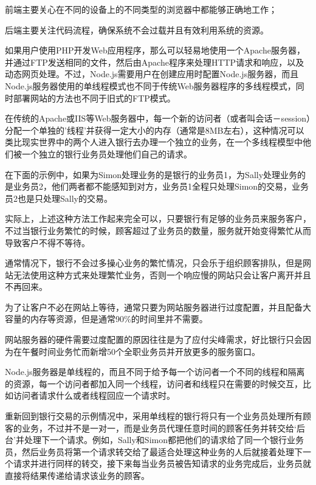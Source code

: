 \begin{compactitem}
\item 前端主要关心在不同的设备上的不同类型的浏览器中都能够正确地工作；
\item 后端主要关注代码流程，确保系统不会过载并且有效利用系统的资源。
\end{compactitem}


如果用户使用PHP开发Web应用程序，那么可以轻易地使用一个Apache服务器，并通过FTP发送相同的文件，然后由Apache程序来处理HTTP请求和响应，以及动态网页处理。不过，Node.js需要用户在创建应用时配置Node.js服务器，而且Node.js服务器使用的单线程模式也不同于传统Web服务器程序的多线程模式，同时部署网站的方法也不同于旧式的FTP模式。



在传统的Apache或IIS等Web服务器中，每一个新的访问者（或者叫会话－session）分配一个单独的'线程'并获得一定大小的内存（通常是8MB左右），这种情况可以类比现实世界中的两个人进入银行去办理一个独立的业务，在一个多线程模型中他们被一个独立的银行业务员处理他们自己的请求。



在下面的示例中，如果为Simon处理业务的是银行的业务员1，为Sally处理业务的是业务员2，他们两者都不能感知到对方，业务员1全程只处理Simon的交易，业务员2也是只处理Sally的交易。

实际上，上述这种方法工作起来完全可以，只要银行有足够的业务员来服务客户，不过当银行业务繁忙的时候，顾客超过了业务员的数量，服务就开始变得繁忙从而导致客户不得不等待。

通常情况下，银行不会过多操心业务的繁忙情况，只会乐于组织顾客排队，但是网站无法使用这种方式来处理繁忙业务，否则一个响应慢的网站只会让客户离开并且不再回来。

为了让客户不必在网站上等待，通常只要为网站服务器进行过度配置，并且配备大容量的内存等资源，但是通常90\%的时间里并不需要。

网站服务器的硬件需要过度配置的原因往往是为了应付尖峰需求，好比银行只会因为在午餐时间业务忙而新增50个全职业务员并开放更多的服务窗口。

Node.js服务器是单线程的，而且不同于给予每一个访问者一个不同的线程和隔离的资源，每一个访问者都加入同一个线程，访问者和线程只在需要的时候交互，比如访问者请求什么或者线程回应一个请求时。

重新回到银行交易的示例情况中，采用单线程的银行将只有一个业务员处理所有顾客的业务，不过并不是一对一，而是业务员代理任意时间的顾客任务并转交给‘后台’并处理下一个请求。例如，Sally和Simon都把他们的请求给了同一个银行业务员，然后业务员将第一个请求转交给了最适合处理这种业务的人后就接着处理下一个请求并进行同样的转交，接下来每当业务员被告知请求的业务完成后，业务员就直接将结果传递给请求该业务的顾客。

